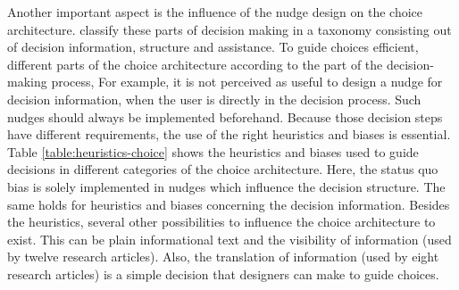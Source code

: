 Another important aspect is the influence of the nudge design on the choice architecture. \cite{munscher_review_2016} classify these parts of decision making in a taxonomy consisting out of decision information, structure and assistance. To guide choices efficient, different parts of the choice architecture according to the part of the decision-making process, For example, it is not perceived as useful to design a nudge for decision information, when the user is directly in the decision process. Such nudges should always be implemented beforehand. Because those decision steps have different requirements, the use of the right heuristics and biases is essential. Table \ref{table:heuristics-choice} shows the heuristics and biases used to guide decisions in different categories of the choice architecture. Here, the status quo bias is solely implemented in nudges which influence the decision structure. The same holds for heuristics and biases concerning the decision information. Besides the heuristics, several other possibilities to influence the choice architecture to exist. This can be plain informational text and the visibility of information (used by twelve research articles). Also, the translation of information (used by eight research articles) is a simple decision that designers can make to guide choices. 

